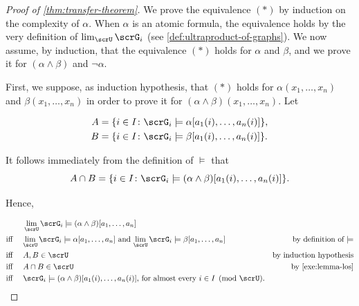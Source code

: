 \begin{proof}[Proof of \cref{thm:transfer-theorem}]
  We prove the equivalence $(*)$ by induction on the complexity of $\alpha$.
  When $\alpha$ is an atomic formula, the equivalence holds by the very definition of $\lim_{\scrU} \scrG_i$ (see \cref{def:ultraproduct-of-graphs}).
  We now assume, by induction, that the equivalence  $(*)$  holds for $\alpha$ and $\beta$, and we prove it for $(\alpha\land\beta)$ and $\neg\alpha$.

  First, we suppose, as induction hypothesis, that  $(*)$  holds for $\alpha(x_1,\dots, x_n)$ and $\beta(x_1,\dots, x_n)$ in order to prove it for  $(\alpha\land\beta)(x_1,\dots, x_n)$.
  Let

  \begin{align*}
  A & =\{i\in I \colon \scrG_i\models \alpha[a_1(i),\dots, a_n(i)] \}, \\
  B & = \{i\in I \colon \scrG_i\models \beta[a_1(i),\dots, a_n(i)] \}.
  \end{align*}

  It follows immediately from the definition of $\models$ that
  \[
    A\cap B=\{i\in I \colon \scrG_i\models (\alpha\land \beta)[a_1(i),\dots, a_n(i)] \}.
  \]

  Hence,

  \begin{align*}
                   & \lim_{\scrU} \scrG_i \models (\alpha\land \beta) [a_1,\dots, a_n]                                                        &                                   \\
  \text{iff \quad} & \text{$\lim_{\scrU} \scrG_i \models \alpha [a_1,\dots, a_n]$ and $\lim_{\scrU} \scrG_i \models \beta [a_1,\dots, a_n]$ } & \text{by definition of $\models$} \\
  \text{iff \quad} & \text{$A, B \in\scrU$}                                                                                                   & \text{by induction hypothesis}    \\
  \text{iff \quad} & \text{$A \cap B \in\scrU$}                                                                                               & \text{by \cref{exe:lemma-los}}    \\
  \text{iff \quad} & \text{$\scrG_i \models (\alpha\land \beta)[a_1(i),\dots, a_n(i)] $, for almost every $i\in I \pmod{\scrU}$.}             &                                   \\
  \end{align*}


\end{proof}
